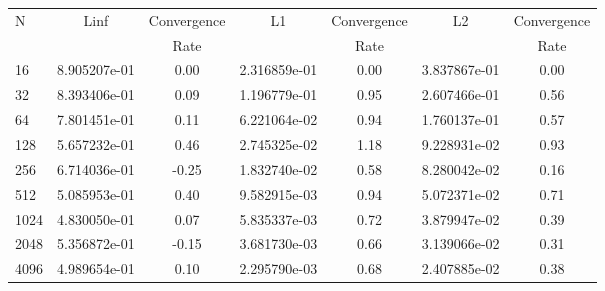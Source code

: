 \documentclass[12pt]{article}
\begin{document}
	\begin{tabular}{l|c|c|c|c|c|c}
		N&Linf&Convergence&L1&Convergence&L2&Convergence\\
		&&Rate&&Rate&&Rate\\
		\hline
		16&8.905207e-01&0.00&2.316859e-01&0.00&3.837867e-01&0.00\\
		\hline
		32&8.393406e-01&0.09&1.196779e-01&0.95&2.607466e-01&0.56\\
		\hline
		64&7.801451e-01&0.11&6.221064e-02&0.94&1.760137e-01&0.57\\
		\hline
		128&5.657232e-01&0.46&2.745325e-02&1.18&9.228931e-02&0.93\\
		\hline
		256&6.714036e-01&-0.25&1.832740e-02&0.58&8.280042e-02&0.16\\
		\hline
		512&5.085953e-01&0.40&9.582915e-03&0.94&5.072371e-02&0.71\\
		\hline
		1024&4.830050e-01&0.07&5.835337e-03&0.72&3.879947e-02&0.39\\
		\hline
		2048&5.356872e-01&-0.15&3.681730e-03&0.66&3.139066e-02&0.31\\
		\hline
		4096&4.989654e-01&0.10&2.295790e-03&0.68&2.407885e-02&0.38\\
	\end{tabular}
\end{document}
